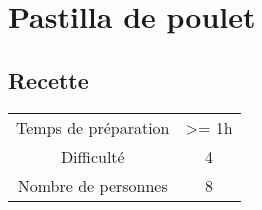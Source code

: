 \newpage
\section{Pastilla de poulet}
    \label{sec:Pastilla de poulet}
    \subsection{Recette}
    \vspace{1cm}


    \begin{center}
        \begin{tabular}{c|c}
            Temps de préparation & >= 1h \\
            Difficulté & 4 \\
            Nombre de personnes & 8 
        \end{tabular}
    \end{center}{}

    \vspace{1cm}
    \hline
    \vspace{1cm}

